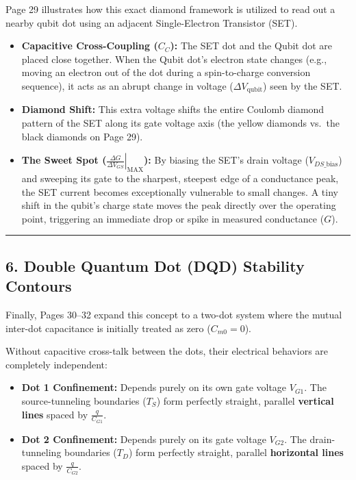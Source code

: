 \documentclass[
]{article}
\providecommand{\tightlist}{%
  \setlength{\itemsep}{0pt}\setlength{\parskip}{0pt}}
\begin{document}
Page 29 illustrates how this exact diamond framework is utilized to read
out a nearby qubit dot using an adjacent Single-Electron Transistor
(SET).

\begin{itemize}
\tightlist
\item
  \textbf{Capacitive Cross-Coupling (\(C_C\)):} The SET dot and the
  Qubit dot are placed close together. When the Qubit dot's electron
  state changes (e.g., moving an electron out of the dot during a
  spin-to-charge conversion sequence), it acts as an abrupt change in
  voltage (\(\Delta V_{\text{qubit}}\)) seen by the SET.
\item
  \textbf{Diamond Shift:} This extra voltage shifts the entire Coulomb
  diamond pattern of the SET along its gate voltage axis (the yellow
  diamonds vs.~the black diamonds on Page 29).
\item
  \textbf{The Sweet Spot
  (\(\left.\frac{\Delta G}{\Delta V_{GS}}\right|_{\text{MAX}}\)):} By
  biasing the SET's drain voltage (\(V_{DS\text{\_bias}}\)) and sweeping
  its gate to the sharpest, steepest edge of a conductance peak, the SET
  current becomes exceptionally vulnerable to small changes. A tiny
  shift in the qubit's charge state moves the peak directly over the
  operating point, triggering an immediate drop or spike in measured
  conductance (\(G\)).
\end{itemize}

\begin{center}\rule{0.5\linewidth}{0.5pt}\end{center}

\subsection{6. Double Quantum Dot (DQD) Stability
Contours}\label{double-quantum-dot-dqd-stability-contours}

Finally, Pages 30--32 expand this concept to a two-dot system where the
mutual inter-dot capacitance is initially treated as zero
(\(C_{m0} = 0\)).

Without capacitive cross-talk between the dots, their electrical
behaviors are completely independent:

\begin{itemize}
\tightlist
\item
  \textbf{Dot 1 Confinement:} Depends purely on its own gate voltage
  \(V_{G1}\). The source-tunneling boundaries (\(T_S\)) form perfectly
  straight, parallel \textbf{vertical lines} spaced by
  \(\frac{q}{C_{G1}}\).
\item
  \textbf{Dot 2 Confinement:} Depends purely on its gate voltage
  \(V_{G2}\). The drain-tunneling boundaries (\(T_D\)) form perfectly
  straight, parallel \textbf{horizontal lines} spaced by
  \(\frac{q}{C_{G2}}\).
\end{itemize}
\end{document}
